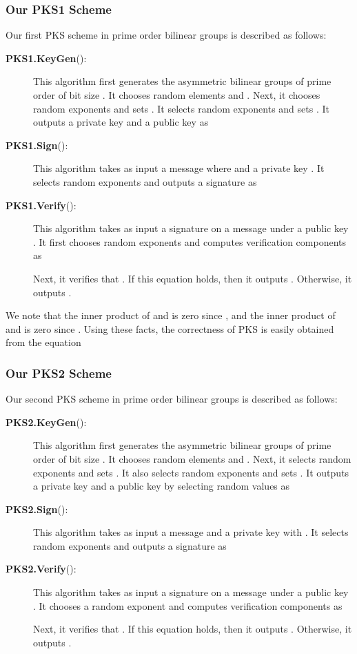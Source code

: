 \documentclass[11pt,letterpaper]{article}
\newcommand{\tb}[1]{\textbf{#1}}
\begin{document}
\subsubsection{Our PKS1 Scheme}

Our first PKS scheme in prime order bilinear groups is described as follows:

\begin{description}
\item [\textbf{PKS1.KeyGen}():] This algorithm first generates
    the asymmetric bilinear groups  of prime order  of bit
    size . It chooses random elements  and
    . Next, it chooses random exponents
     and sets . It
    selects random exponents  and sets . It outputs a private key 
    and a public key as
    

\item [\textbf{PKS1.Sign}():] This algorithm takes as input a
    message  where  and a private key . It selects random exponents  and outputs
    a signature as
    

\item [\textbf{PKS1.Verify}():] This algorithm takes as
    input a signature  on a message  under a public
    key . It first chooses random exponents  and
    computes verification components as
    
    Next, it verifies that . If
    this equation holds, then it outputs . Otherwise, it outputs .
\end{description}

We note that the inner product of  and  is zero since , and the inner product of  and  is zero since . Using these facts,
the correctness of PKS is easily obtained from the equation
    

\subsubsection{Our PKS2 Scheme}

Our second PKS scheme in prime order bilinear groups is described as follows:

\begin{description}
\item [\tb{PKS2.KeyGen}():] This algorithm first generates the
    asymmetric bilinear groups  of prime order  of bit
    size . It chooses random elements  and
    . Next, it selects random exponents  and sets . It also selects
    random exponents  and sets . It outputs a private key 
    and a public key by selecting random values  as
    

\item [\tb{PKS2.Sign}():] This algorithm takes as input a message  and a private key  with . It
    selects random exponents  and outputs a signature
    as
    

\item [\tb{PKS2.Verify}():] This algorithm takes as input a
    signature  on a message  under a public key .
    It chooses a random exponent  and computes verification
    components as
    
    Next, it verifies that . If
    this equation holds, then it outputs . Otherwise, it outputs .
\end{description}
\end{document}
